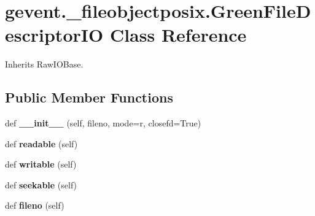 \hypertarget{classgevent_1_1__fileobjectposix_1_1_green_file_descriptor_i_o}{}\section{gevent.\+\_\+fileobjectposix.\+Green\+File\+Descriptor\+IO Class Reference}
\label{classgevent_1_1__fileobjectposix_1_1_green_file_descriptor_i_o}


Inherits Raw\+I\+O\+Base.

\subsection*{Public Member Functions}
\begin{DoxyCompactItemize}
\item 
\mbox{\label{classgevent_1_1__fileobjectposix_1_1_green_file_descriptor_i_o_a41fb9523cffa79665934c42a1b9edce0}} 
def {\bfseries \+\_\+\+\_\+init\+\_\+\+\_\+} (self, fileno, mode=\textquotesingle{}r\textquotesingle{}, closefd=True)
\item 
\mbox{\label{classgevent_1_1__fileobjectposix_1_1_green_file_descriptor_i_o_a5e54e33f2170ab61624fff06b5668f32}} 
def {\bfseries readable} (self)
\item 
\mbox{\label{classgevent_1_1__fileobjectposix_1_1_green_file_descriptor_i_o_aa03d290879c0693dfe13766a436a32a3}} 
def {\bfseries writable} (self)
\item 
\mbox{\label{classgevent_1_1__fileobjectposix_1_1_green_file_descriptor_i_o_af307872fefab6129e08752b442bf8755}} 
def {\bfseries seekable} (self)
\item 
\mbox{\label{classgevent_1_1__fileobjectposix_1_1_green_file_descriptor_i_o_a85f4ef9bad16461ad964bf6c69dd438e}} 
def {\bfseries fileno} (self)
\item 
\mbox{\label{classgevent_1_1__fileobjectposix_1_1_green_file_descriptor_i_o_af1607244ebf57d13ff001ed3a5fb99ab}} 

\end{DoxyCompactItemize}
